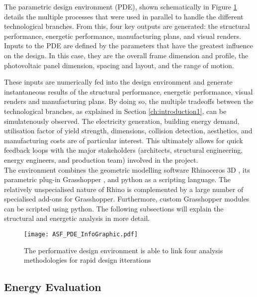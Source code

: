 
The parametric design environment (PDE), shown schematically in Figure \ref{fig:performative} details the multiple processes that were used in parallel to handle the different technological branches. From this, four key outputs are generated: the structural performance, energetic performance, manufacturing plans, and visual renders. Inputs to the PDE are defined by the parameters that have the greatest influence on the design. In this case, they are the overall frame dimension and profile, the photovoltaic panel dimension, spacing and layout, and the range of motion. 

These inputs are numerically fed into the design environment and generate instantaneous results of the structural performance, energetic performance, visual renders and manufacturing plans. By doing so, the multiple tradeoffs between the technological branches, as explained in Section \ref{ch:introduction1}, can be simulatenously observed. The electricity generation, building energy demand, utilisation factor of yield strength, dimensions, collision detection, aesthetics, and manufacturing costs are of particular interest. This ultimately allows for quick feedback loops with the major stakeholders (architects, structural engineering, energy engineers, and production team) involved in the project. \\


The environment combines the geometric modelling software Rhinoceros 3D \cite{Rhino}, its parametric plug-in Grasshopper \cite{grasshopper}, and python \cite{python} as a scripting language. The relatively unspecialised nature of Rhino is complemented by a large number of specialised add-ons for Grasshopper. Furthermore, custom Grasshopper modules can be scripted using python. The following subsections will explain the structural and energetic analysis in more detail.

\begin{figure}
\begin{center}
\texttt{[image: ASF\_PDE\_InfoGraphic.pdf]}
\caption{The performative design environment is able to link four analysis methodologies for rapid design itterations}
\label{fig:performative}
\end{center}
\end{figure}

\subsection{Energy Evaluation}
\label{ch:energy}

